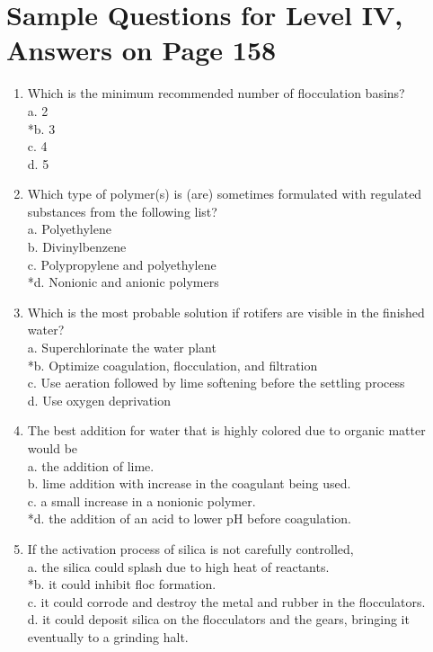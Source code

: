 \section{Sample Questions for Level IV, Answers on Page 158}
\begin{enumerate}[label=TIV-\arabic*]
  \item Which is the minimum recommended number of flocculation basins?\\
a. 2\\
*b. 3\\
c. 4\\
d. 5\\
  \item Which type of polymer(s) is (are) sometimes formulated with regulated substances from the following list?\\
a. Polyethylene\\
b. Divinylbenzene\\
c. Polypropylene and polyethylene\\
*d. Nonionic and anionic polymers\\
  \item Which is the most probable solution if rotifers are visible in the finished water?\\
a. Superchlorinate the water plant\\
*b. Optimize coagulation, flocculation, and filtration\\
c. Use aeration followed by lime softening before the settling process\\
d. Use oxygen deprivation\\
  \item The best addition for water that is highly colored due to organic matter would be\\
a. the addition of lime.\\
b. lime addition with increase in the coagulant being used.\\
c. a small increase in a nonionic polymer.\\
*d. the addition of an acid to lower pH before coagulation.\\
  \item If the activation process of silica is not carefully controlled,\\
a. the silica could splash due to high heat of reactants.\\
*b. it could inhibit floc formation.\\
c. it could corrode and destroy the metal and rubber in the flocculators.\\
d. it could deposit silica on the flocculators and the gears, bringing it eventually to a grinding halt.\\
\end{enumerate}
